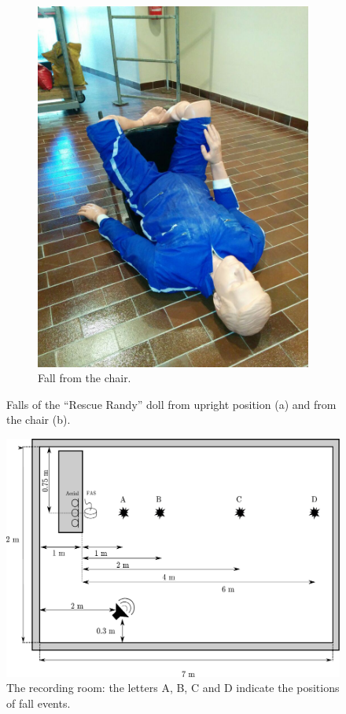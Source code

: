 \begin{figure}[t]
\begin{subfigure}[b]{0.48\textwidth}
		\includegraphics[width=\textwidth]{img/rndy_caduta_sedia.jpg}
		\caption{Fall from the chair.}\label{fig:randy_chair}
	\end{subfigure}
	\caption{Falls of the ``Rescue Randy'' doll from upright position (a) and from the chair (b).}\label{fig:randy}
\end{figure}

\begin{figure}[t]
	\centering
	\includegraphics[width=\columnwidth]{img/room_experiments.pdf}
	\caption{The recording room: the letters A, B, C and D indicate the positions of fall events.}
	\label{fig:room}
\end{figure}

